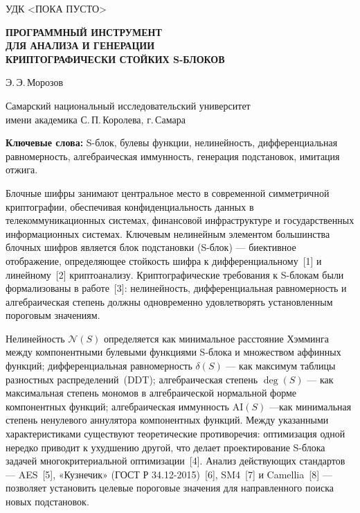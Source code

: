 \documentclass[10pt, a5paper]{extarticle}
\begin{document}
\noindent УДК <ПОКА ПУСТО>

\vspace{0.25\baselineskip}

\begin{center}
\textbf{ПРОГРАММНЫЙ ИНСТРУМЕНТ\\ ДЛЯ АНАЛИЗА И ГЕНЕРАЦИИ\\
КРИПТОГРАФИЧЕСКИ СТОЙКИХ S-БЛОКОВ}
\end{center}

\vspace{0.25\baselineskip}

\begin{center}
Э.\,Э.\,Морозов
\end{center}

\vspace{0.2\baselineskip}

\begin{center}
Самарский национальный исследовательский университет\\
имени академика С.\,П.\,Королева, г.\,Самара
\end{center}

\vspace{0.25\baselineskip}

\noindent\textbf{Ключевые слова:} S-блок, булевы функции, нелинейность,
дифференциальная равномерность, алгебраическая иммунность,
генерация подстановок, имитация отжига.

\vspace{0.25\baselineskip}

Блочные шифры занимают центральное место в современной симметричной
криптографии, обеспечивая конфиденциальность данных в телекоммуникационных
системах, финансовой инфраструктуре и государственных информационных системах.
Ключевым нелинейным элементом большинства блочных шифров является блок
подстановки (S-блок) --- биективное отображение, определяющее стойкость шифра
к дифференциальному~[1] и линейному~[2] криптоанализу.
Криптографические требования к S-блокам были формализованы
в работе~[3]: нелинейность, дифференциальная равномерность
и алгебраическая степень должны одновременно удовлетворять
установленным пороговым значениям.

Нелинейность $\mathcal{N}(S)$ определяется как минимальное расстояние Хэмминга
между компонентными булевыми функциями S-блока и множеством аффинных функций;
дифференциальная равномерность $\delta(S)$ --- как максимум таблицы разностных
распределений~(DDT); алгебраическая степень $\deg(S)$ --- как максимальная
степень мономов в алгебраической нормальной форме компонентных функций;
алгебраическая иммунность $\mathrm{AI}(S)$ ---как минимальная степень ненулевого аннулятора
компонентных функций.
Между указанными характеристиками существуют теоретические
противоречия: оптимизация одной нередко приводит к ухудшению другой,
что делает проектирование S-блока задачей многокритериальной
оптимизации~[4]. Анализ действующих
стандартов --- AES~[5], «Кузнечик» (ГОСТ Р 34.12-2015)~[6], SM4~[7] и Camellia~[8] --- позволяет установить целевые пороговые значения
для направленного поиска новых подстановок.
\end{document}
